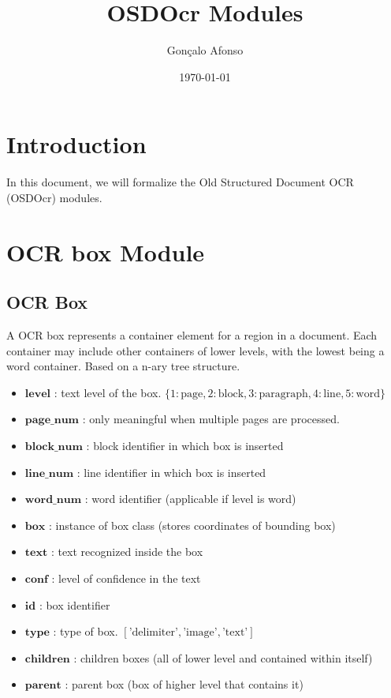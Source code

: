 \documentclass{article}
\title{OSDOcr Modules}
\author{Gonçalo Afonso}
\date{\today}
\begin{document}
\maketitle

\section{Introduction}

In this document, we will formalize the Old Structured Document OCR (OSDOcr) modules.

\section{OCR box Module}

\subsection{OCR Box}

A OCR box represents a container element for a region in a document. Each container may include other containers of lower levels, 
with the lowest being a word container. Based on a n-ary tree structure.

\begin{itemize}
    \item $\mathbf{level}$ : text level of the box. $\{ 1:\text{page}, 2:\text{block}, 3:\text{paragraph}, 4:\text{line}, 5:\text{word} \}$

    \item $\mathbf{page\_num}$ : only meaningful when multiple pages are processed.

    \item $\mathbf{block\_num}$ : block identifier in which box is inserted

    \item $\mathbf{line\_num}$ : line identifier in which box is inserted
    
    \item $\mathbf{word\_num}$ : word identifier (applicable if level is word)

    \item $\mathbf{box}$ : instance of box class (stores coordinates of bounding box)

    \item $\mathbf{text}$ : text recognized inside the box

    \item $\mathbf{conf}$ : level of confidence in the text
    
    \item $\mathbf{id}$ : box identifier

    \item $\mathbf{type}$ : type of box. $[\text{'delimiter'},\text{'image'},\text{'text'}]$
    
    \item $\mathbf{children}$ : children boxes (all of lower level and contained within itself)
    
    \item $\mathbf{parent}$ : parent box (box of higher level that contains it)

\end{itemize}
\end{document}
